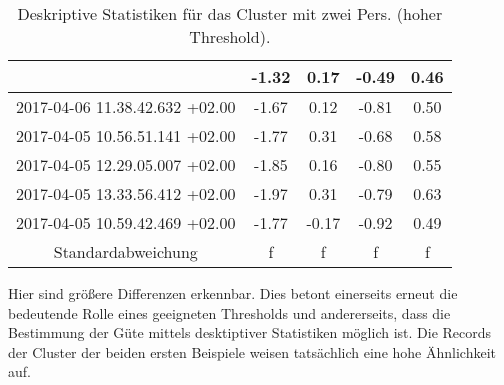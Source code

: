\begin{center}
\begin{table}[ht]
\begin{tabular}{ |c|c|c|c|c| }
        & -1.32
        & 0.17
        & -0.49
        & 0.46 \\
        \hline
        2017-04-06 11.38.42.632 +02.00
        & -1.67
        & 0.12
        & -0.81
        & 0.50 \\
        \hline
        2017-04-05 10.56.51.141 +02.00
        & -1.77
        & 0.31
        & -0.68
        & 0.58 \\
        \hline
        2017-04-05 12.29.05.007 +02.00
        & -1.85
        & 0.16
        & -0.80
        & 0.55 \\
        \hline
        2017-04-05 13.33.56.412 +02.00
        & -1.97
        & 0.31
        & -0.79
        & 0.63 \\
        \hline
        2017-04-05 10.59.42.469 +02.00
        & -1.77
        & -0.17
        & -0.92
        & 0.49 \\
        \hline
        \hline
        Standardabweichung
        & f
        & f
        & f
        & f \\
        \hline
       \end{tabular}
    \caption{Deskriptive Statistiken für das Cluster mit zwei Pers. (hoher Threshold).}
    \label{tbl:ClustTwoPersHighThreshold}
    \end{table}
  \end{center}
  Hier sind größere Differenzen erkennbar.
  Dies betont einerseits erneut die bedeutende Rolle eines geeigneten Thresholds
  und andererseits, dass die Bestimmung der Güte mittels desktiptiver Statistiken möglich ist.
  Die Records der Cluster der beiden ersten Beispiele weisen tatsächlich eine hohe Ähnlichkeit auf.